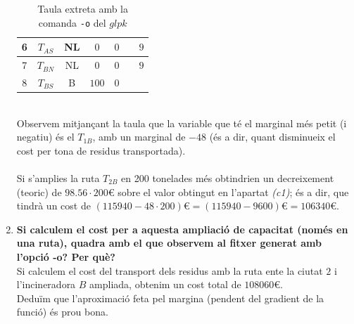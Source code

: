 \documentclass[a4paper, 11pt]{article}
\begin{document}
\begin{enumerate}
\begin{table}[h]
\begin{tabular}{ c | c | c | c | c | c | c }
        6 & $T_{AS}$ & NL & $0$ & $0$ &  & $9$ \\ \hline
        7 & $T_{BN}$ & NL & $0$ & $0$ &  & $9$ \\ \hline
        8 & $T_{BS}$ & B & $100$ & $0$ &  & \\
    \end{tabular}
    \caption{Taula extreta amb la comanda \texttt{-o} del $glpk$}
    \label{tab:my_label}
\end{table}\\
Observem mitjançant la taula que la variable que té el marginal més petit (i negatiu) és el $T_{1B}$, amb un marginal de $-48$ (és a dir, quant disminueix el cost per tona de residus transportada).\\
\\
Si s'amplies la ruta $T_{2B}$ en 200 tonelades més obtindrien un decreixement (teoric) de $98.56\cdot 200$\euro \hspace{0.06215em} sobre el valor obtingut en l'apartat \textit{(c1)}; és a dir, que tindrà un cost de $(115940-48\cdot 200)$\euro\hspace{0.06215em}$= (115940-9600)$\euro\hspace{0.06215em}$=106340$\euro.
    \item \textbf{Si calculem el cost per a aquesta ampliació de capacitat (només en una ruta), quadra amb el que observem al fitxer generat amb l’opció -o? Per què?}\\
    Si calculem el cost del transport dels residus amb la ruta ente la ciutat $2$ i l'incineradora $B$ ampliada, obtenim un cost total de $108060$\euro.\\
    Deduïm que l'aproximació feta pel margina (pendent del gradient de la funció) és prou bona.
\end{enumerate}
\newpage
\end{document}

